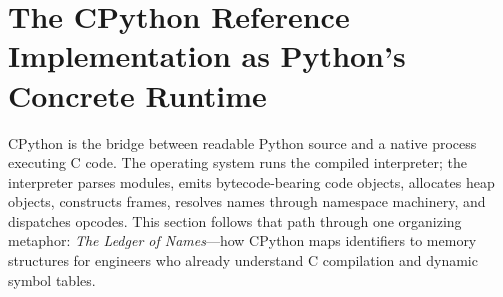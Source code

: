 \section{The CPython Reference Implementation as Python's Concrete Runtime}

CPython is the bridge between readable Python source and a native process executing C code. The operating system runs the compiled interpreter; the interpreter parses modules, emits bytecode-bearing code objects, allocates heap objects, constructs frames, resolves names through namespace machinery, and dispatches opcodes. This section follows that path through one organizing metaphor: \emph{The Ledger of Names}---how CPython maps identifiers to memory structures for engineers who already understand C compilation and dynamic symbol tables.
